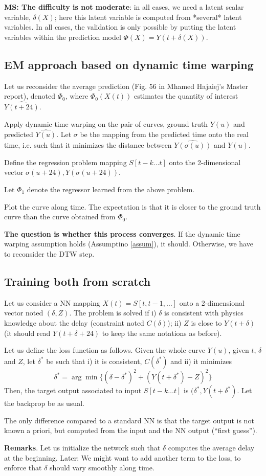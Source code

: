 \documentclass[]{article}
\theoremstyle{definition}
\begin{document}
\textbf{MS: The difficulty is not moderate}: in all cases, we need a latent scalar variable, $\delta(X)$; here this latent variable is computed from *several* latent variables. In all cases, the validation is only possible by putting the latent variables within the prediction model $\Phi(X) = Y(t + \delta(X))$. 

\subsection{EM approach based on dynamic time warping}\label{model3}

Let us reconsider the average prediction (Fig. 56 in Mhamed Hajaiej's Master report), denoted $\Phi_0$, where $\Phi_0(X(t))$ estimates the quantity of interest $\widehat{Y(t+24)}$. 

Apply dynamic time warping on the pair of curves, ground truth $Y(u)$ and predicted $\widehat{Y(u)}$. Let $\sigma$ be the mapping from the predicted time onto the real time, i.e. such that it minimizes the distance between $\widehat{Y(\sigma(u))}$ and $Y(u)$. 

Define the regression problem mapping $S[t-k \ldots t]$ onto the 2-dimensional vector $\sigma(u+24), Y(\sigma(u+24))$. 

Let $\Phi_1$ denote the regressor learned from the above problem. 

Plot the curve along time. The expectation is that it is closer to the ground truth curve than the curve obtained from $\Phi_0$. 

\textbf{The question is whether this process converges}. If the dynamic time warping assumption holds (Assumptino \ref{assum}), it should. Otherwise, we have to reconsider the DTW step.

\subsection{Training both from scratch}\label{model4}

Let us consider a NN mapping $X(t) = S[t, t-1, \ldots]$ onto a 2-dimensional vector noted $(\delta, Z)$. 
The problem is solved if i) $\delta$ is consistent with physics knowledge about the delay (constraint noted $C(\delta)$); ii) $Z$ is close to $Y(t+\delta)$ (it should read $Y(t+\delta+24)$ to keep the same notations as before).

Let us define the loss function as follows. Given the whole curve $Y(u)$, given $t$, $\delta$ and $Z$, let $\delta^*$ be such that i) it is consistent, $C(\delta^*)$ and ii) it minimizes
\[ \delta^* = \arg \min \{ (\delta - \delta^*)^2 + (Y(t + \delta^*) - Z)^2 \}
 \]
Then, the target output associated to input $S[t-k \ldots t]$ is $(\delta^*, Y(t + \delta^*)$. 
Let the backprop be as usual. 

The only difference compared to a standard NN is that the target output is not known a priori, but computed from the input and the NN output (``first guess''). 

\textbf{Remarks}. Let us initialize the network such that $\delta$ computes the average delay at the beginning. Later: We might want to add another term to the loss, to enforce that $\delta$ should vary smoothly along time. 
\end{document}
